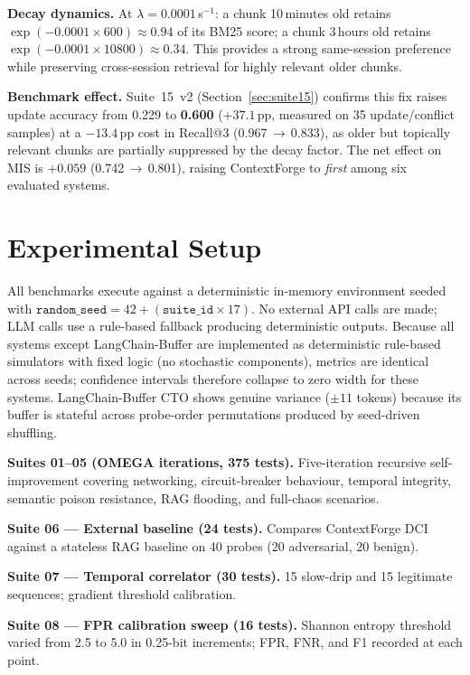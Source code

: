 \documentclass[11pt,twocolumn]{article}
\begin{document}
\textbf{Decay dynamics.}
At $\lambda = 0.0001$\,s$^{-1}$:
a chunk 10\,minutes old retains $\exp(-0.0001 \times 600) \approx 0.94$ of its BM25 score;
a chunk 3\,hours old retains $\exp(-0.0001 \times 10800) \approx 0.34$.
This provides a strong same-session preference while preserving cross-session
retrieval for highly relevant older chunks.

\textbf{Benchmark effect.}
Suite~15~v2 (Section~\ref{sec:suite15}) confirms this fix raises update
accuracy from 0.229 to \textbf{0.600} ($+37.1$\,pp, measured on 35 update/conflict
samples) at a $-13.4$\,pp cost in Recall@3 (0.967\,$\to$\,0.833), as older
but topically relevant chunks are partially suppressed by the decay factor.
The net effect on MIS is $+0.059$ (0.742\,$\to$\,0.801), raising ContextForge
to \emph{first} among six evaluated systems.

\section{Experimental Setup}
\label{sec:setup}

All benchmarks execute against a deterministic in-memory environment seeded
with $\texttt{random\_seed} = 42 + (\texttt{suite\_id} \times 17)$. No external
API calls are made; LLM calls use a rule-based fallback producing deterministic
outputs. Because all systems except LangChain-Buffer are implemented as
deterministic rule-based simulators with fixed logic (no stochastic
components), metrics are identical across seeds; confidence intervals therefore
collapse to zero width for these systems. LangChain-Buffer CTO shows genuine
variance ($\pm 11$ tokens) because its buffer is stateful across probe-order
permutations produced by seed-driven shuffling.

\textbf{Suites 01--05 (OMEGA iterations, 375 tests).}
Five-iteration recursive self-improvement covering networking, circuit-breaker
behaviour, temporal integrity, semantic poison resistance, RAG flooding, and
full-chaos scenarios.

\textbf{Suite 06 --- External baseline (24 tests).}
Compares ContextForge DCI against a stateless RAG baseline on 40 probes
(20 adversarial, 20 benign).

\textbf{Suite 07 --- Temporal correlator (30 tests).}
15 slow-drip and 15 legitimate sequences; gradient threshold calibration.

\textbf{Suite 08 --- FPR calibration sweep (16 tests).}
Shannon entropy threshold varied from 2.5 to 5.0 in 0.25-bit increments;
FPR, FNR, and F1 recorded at each point.
\end{document}
